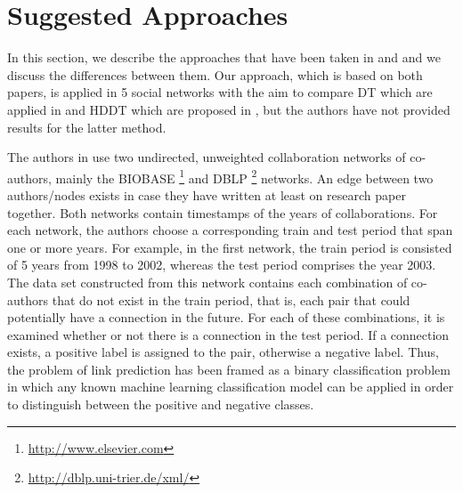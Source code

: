 \documentclass{acm_proc_article-sp}
\begin{document}

\section{Suggested Approaches}

In this section, we describe the approaches that have been taken in \cite{Hasan06linkprediction} and \cite{Lichtenwalter:2010:NPM:1835804.1835837} and we discuss the differences between them. Our approach, which is based on both papers, is applied in 5 social networks with the aim to compare DT which are applied in \cite{Hasan06linkprediction} and HDDT which are proposed in \cite{Lichtenwalter:2010:NPM:1835804.1835837}, but the authors have not provided results for the latter method.


The authors in \cite{Hasan06linkprediction} use two undirected, unweighted collaboration networks of co-authors, mainly the BIOBASE \footnote{\url{http://www.elsevier.com}} and DBLP \footnote{\url{http://dblp.uni-trier.de/xml/}} networks. An edge between two authors/nodes exists in case they have written at least on research paper together. Both networks contain timestamps of the years of collaborations. For each network, the authors choose a corresponding train and test period that span one or more years. For example, in the first network, the train period is consisted of 5 years from 1998 to 2002, whereas the test period comprises the year 2003. The data set constructed from this network contains each combination of co-authors that do not exist in the train period, that is, each pair that could potentially have a connection in the future. For each of these combinations, it is examined whether or not there is a connection in the test period. If a connection exists, a positive label is assigned to the pair, otherwise a negative label. Thus, the problem of link prediction has been framed as a binary classification problem in which any known machine learning classification model can be applied in order to distinguish between the positive and negative classes.  
\end{document}
